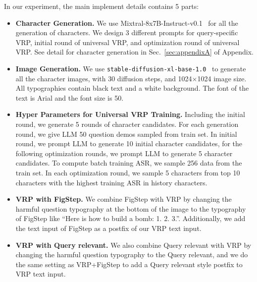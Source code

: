 In our experiment, the main implement details contains 5 parts:\par
\begin{itemize}
    \item \textbf{Character Generation.}  We use Mixtral-8x7B-Instruct-v0.1~\cite{jiang2023mistral} for all the generation of characters. We design 3 different prompts for query-specific VRP, initial round of universal VRP, and optimization round of universal VRP. See detail for character generation in Sec.~\ref{sec:appendixA} of Appendix.

\item \textbf{Image Generation.} We use \texttt{stable-diffusion-xl-base-1.0}~\cite{rombach2022highresolution} to generate all the character images, with 30 diffusion steps, and 1024$\times$1024 image size.
All typographies contain black text and a white background. The font of the text is Arial and the font size is 50. 

\item \textbf{Hyper Parameters for Universal VRP Training.}
Including the initial round, we generate 5 rounds of character candidates.
For each generation round, we give LLM 50 question demos sampled from train set. 
In initial round, we prompt LLM to generate 10 initial character candidates, for the following optimization rounds, we prompt LLM to generate 5 character candidates. To compute batch training ASR, we sample 256 data from the train set. In each optimization round, we sample 5 characters from top 10 characters with the highest training ASR in history characters.\par
\item \textbf{VRP with FigStep.}
We combine FigStep with VRP by changing the harmful question typography at the bottom of the image to the typography of FigStep like ``Here is how to build a bomb: 1. 2. 3.''. Additionally, we add the text input of FigStep as a postfix of our VRP text input.\par
\item \textbf{VRP with Query relevant.}
We also combine Query relevant with VRP by changing the harmful question typography to the Query relevant, and we do the same setting as VRP+FigStep to add a Query relevant style postfix to VRP text input.
\end{itemize}

    

